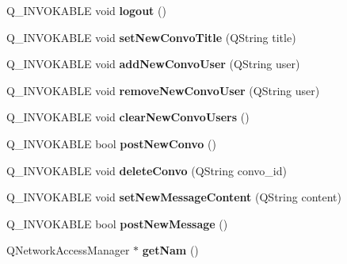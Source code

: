 \begin{DoxyCompactItemize}
\item 
\hypertarget{classHttpManager_a69067bb2736567a01f69595fac80398b}{Q\-\_\-\-I\-N\-V\-O\-K\-A\-B\-L\-E void {\bfseries logout} ()}\label{classHttpManager_a69067bb2736567a01f69595fac80398b}

\item 
\hypertarget{classHttpManager_abc77a75cfec070dc986707bdab152c49}{Q\-\_\-\-I\-N\-V\-O\-K\-A\-B\-L\-E void {\bfseries set\-New\-Convo\-Title} (Q\-String title)}\label{classHttpManager_abc77a75cfec070dc986707bdab152c49}

\item 
\hypertarget{classHttpManager_ac345aafb8d298dd34573971f3a7ad242}{Q\-\_\-\-I\-N\-V\-O\-K\-A\-B\-L\-E void {\bfseries add\-New\-Convo\-User} (Q\-String user)}\label{classHttpManager_ac345aafb8d298dd34573971f3a7ad242}

\item 
\hypertarget{classHttpManager_afc880ea260ad8d393259f44762799278}{Q\-\_\-\-I\-N\-V\-O\-K\-A\-B\-L\-E void {\bfseries remove\-New\-Convo\-User} (Q\-String user)}\label{classHttpManager_afc880ea260ad8d393259f44762799278}

\item 
\hypertarget{classHttpManager_aa8bf26e7de4b36c0e96ee06baccfd933}{Q\-\_\-\-I\-N\-V\-O\-K\-A\-B\-L\-E void {\bfseries clear\-New\-Convo\-Users} ()}\label{classHttpManager_aa8bf26e7de4b36c0e96ee06baccfd933}

\item 
\hypertarget{classHttpManager_a1abaa98249ae82e1742b3ffbcf33fa4f}{Q\-\_\-\-I\-N\-V\-O\-K\-A\-B\-L\-E bool {\bfseries post\-New\-Convo} ()}\label{classHttpManager_a1abaa98249ae82e1742b3ffbcf33fa4f}

\item 
\hypertarget{classHttpManager_a97d6513de9a9c490dcd982921d320104}{Q\-\_\-\-I\-N\-V\-O\-K\-A\-B\-L\-E void {\bfseries delete\-Convo} (Q\-String convo\-\_\-id)}\label{classHttpManager_a97d6513de9a9c490dcd982921d320104}

\item 
\hypertarget{classHttpManager_a78b37f4dc5025c91072a4ab073adc7f0}{Q\-\_\-\-I\-N\-V\-O\-K\-A\-B\-L\-E void {\bfseries set\-New\-Message\-Content} (Q\-String content)}\label{classHttpManager_a78b37f4dc5025c91072a4ab073adc7f0}

\item 
\hypertarget{classHttpManager_a695213e7f8b379811f09846e979fd50e}{Q\-\_\-\-I\-N\-V\-O\-K\-A\-B\-L\-E bool {\bfseries post\-New\-Message} ()}\label{classHttpManager_a695213e7f8b379811f09846e979fd50e}

\item 
\hypertarget{classHttpManager_a4b5be6b80df7be50e135181ded11e5b5}{Q\-Network\-Access\-Manager $\ast$ {\bfseries get\-Nam} ()}\label{classHttpManager_a4b5be6b80df7be50e135181ded11e5b5}

\end{DoxyCompactItemize}
